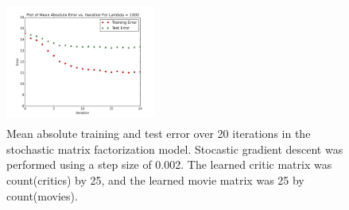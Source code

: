 \documentclass[12pt]{article}
\newcommand{\factwidth}{0.44}
\newcommand{\factheight}{1.6in}
\begin{document}
\begin{figure}[H]
\includegraphics[width=0\factwidth\textwidth,height=\factheight]{matrix_plots/test-i40d25l1000.png}
\caption{Mean absolute training and test error over 20 iterations in the stochastic matrix factorization model. Stocastic gradient descent was performed using a step size of 0.002. The learned critic matrix was count(critics) by 25, and the learned movie matrix was 25 by count(movies).}
\label{fig:fac-d25}
\end{figure}
\end{document}
